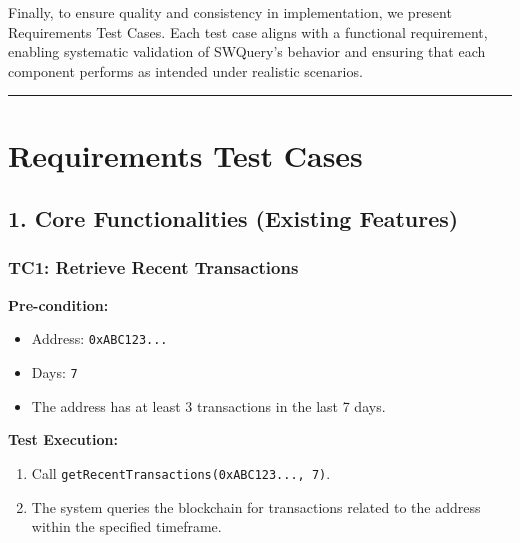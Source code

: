 \documentclass[
]{article}
\providecommand{\tightlist}{%
  \setlength{\itemsep}{0pt}\setlength{\parskip}{0pt}}
\begin{document}
Finally, to ensure quality and consistency in implementation, we present Requirements Test Cases. Each test case aligns with a functional requirement, enabling systematic validation of SWQuery’s behavior and ensuring that each component performs as intended under realistic scenarios.

\begin{center}\rule{0.5\linewidth}{0.5pt}\end{center}

\hypertarget{requirements-test-cases}{%
\section{\texorpdfstring{\textbf{Requirements Test
Cases}}{Requirements Test Cases}}\label{requirements-test-cases}}

\hypertarget{core-functionalities-existing-features-1}{%
\subsection{\texorpdfstring{\textbf{1. Core Functionalities (Existing
Features)}}{1. Core Functionalities (Existing Features)}}\label{core-functionalities-existing-features-1}}

\hypertarget{tc1-retrieve-recent-transactions}{%
\subsubsection{\texorpdfstring{\textbf{TC1: Retrieve Recent
Transactions}}{TC1: Retrieve Recent Transactions}}\label{tc1-retrieve-recent-transactions}}

\textbf{Pre-condition:}

\begin{itemize}
\tightlist
\item
  Address: \texttt{0xABC123...}
\item
  Days: \texttt{7}
\item
  The address has at least 3 transactions in the last 7 days.
\end{itemize}

\textbf{Test Execution:}

\begin{enumerate}
\def\labelenumi{\arabic{enumi}.}
\tightlist
\item
  Call \texttt{getRecentTransactions(0xABC123...,\ 7)}.
\item
  The system queries the blockchain for transactions related to the
  address within the specified timeframe.
\end{enumerate}
\end{document}
